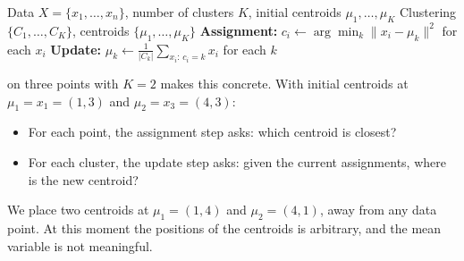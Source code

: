 \begin{algorithm}[H]
\caption{K-Means}
\begin{algorithmic}[1]
\Require Data $X = \{x_1, \ldots, x_n\}$, number of clusters $K$, initial centroids $\mu_1, \ldots, \mu_K$
\Ensure Clustering $\{C_1, \ldots, C_K\}$, centroids $\{\mu_1, \ldots, \mu_K\}$
\Repeat
    \State \textbf{Assignment:} $c_i \leftarrow \arg\min_k \|x_i - \mu_k\|^2$ for each $x_i$
    \State \textbf{Update:} $\mu_k \leftarrow \frac{1}{|C_k|} \sum_{x_i:\, c_i = k} x_i$ for each $k$
\end{algorithmic}
\end{algorithm}



 on three points with $K{=}2$ makes this concrete.
With initial centroids at $\mu_1{=}x_1{=}(1,3)$ and $\mu_2{=}x_3{=}(4,3)$:

\begin{itemize}
    \item For each point, the assignment step asks: which centroid is closest?
    \item For each cluster, the update step asks: given the current assignments, where is the new centroid?
\end{itemize}


 We place two centroids at $\mu_1 = (1,4)$ and $\mu_2 = (4,1)$, 
away from any data point. At this moment the positions of the centroids is arbitrary, and the mean variable is not
meaningful.

